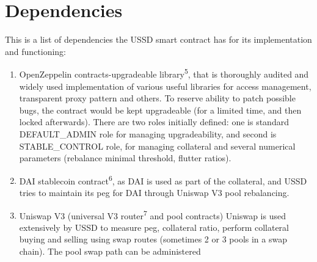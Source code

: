 \section{Dependencies}

This is a list of dependencies the USSD smart contract has for its implementation
and functioning:

\begin{enumerate}
  \item OpenZeppelin contracts-upgradeable library\textsuperscript{5}, that is 
  thoroughly audited and widely used implementation of various useful libraries for 
  access management, transparent proxy pattern and others. To reserve ability to 
  patch possible bugs, the contract would be kept upgradeable (for a limited time, 
  and then locked afterwards). There are two roles initially defined: one is standard
  DEFAULT\_ADMIN role for managing upgradeability, and second is STABLE\_CONTROL role,
  for managing collateral and several numerical parameters (rebalance minimal threshold,
  flutter ratios).
  \item DAI stablecoin contract\textsuperscript{6}, as     
       DAI is used as part of the collateral, and USSD tries to maintain its peg for DAI
       through Uniswap V3 pool rebalancing.
  \item Uniswap V3 (universal V3 router\textsuperscript{7} and pool contracts)
       Uniswap is used extensively by USSD to measure peg, collateral ratio, 
       perform collateral buying and selling using swap routes (sometimes 2 or 3 pools
       in a swap chain). The pool swap path can be administered
\end{enumerate}


\addtocounter{footnote}{1}
\addtocounter{footnote}{1}
\addtocounter{footnote}{1}

